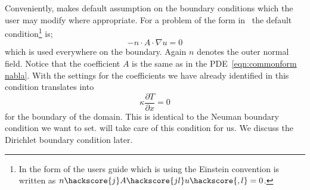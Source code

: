 Conveniently, \esc makes default assumption on the boundary conditions which the user may modify where appropriate. 
For a problem of the form in~ the default condition\footnote{In the form of the \esc users guide which is using the Einstein convention is written as 
$n\hackscore{j}A\hackscore{jl} u\hackscore{,l}=0$.} is;
\begin{equation}\label{NEUMAN 2}
-n\cdot A \cdot\nabla u = 0 
\end{equation}
which is used everywhere on the boundary. Again $n$ denotes the outer normal field. 
Notice that the coefficient $A$ is the same as in the \esc PDE~\ref{eqn:commonform nabla}. 
With the settings for the coefficients we have already identified in  this
condition translates into 
\begin{equation}\label{NEUMAN 2b}
\kappa \frac{\partial T}{\partial x} = 0 
\end{equation}
for the boundary of the domain. This is identical to the Neuman boundary condition we want to set. \esc will take care of this condition for us. We discuss the Dirichlet boundary condition later.

